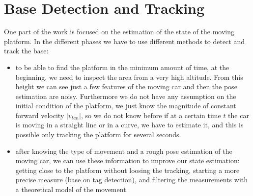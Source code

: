 \chapter{Base Detection and Tracking}\label{chap:base_tracking}
One part of the work is focused on the estimation of the state of the moving platform. In the different phases we have to use different methods to detect and track the base:
\begin{itemize}
\item to be able to find the platform in the minimum amount of time, at the beginning, we need to inspect the area from a very high altitude. From this height we can see just a few features of the moving car and then the pose estimation are noisy. Furthermore we do not have any assumption on the initial condition of the platform, we just know the magnitude of constant forward velocity $|v_{tan}|$, so we do not know before if at a certain time $t$ the car is moving in a straight line or in a curve, we have to estimate it, and this is possible only tracking the platform for several seconds. 
\item after knowing the type of movement and a rough pose estimation of the moving car, we can use these information to improve our state estimation: getting close to the platform without loosing the tracking, starting a more precise measure (base on tag detection), and filtering the measurements with a theoretical model of the movement.
\end{itemize}


